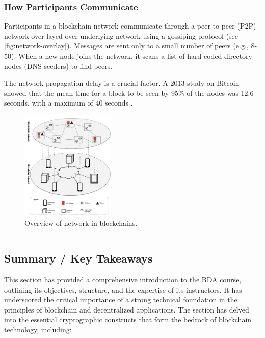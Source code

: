 \subsubsection{How Participants
	Communicate}\label{how-participants-communicate}

Participants in a blockchain network communicate through a peer-to-peer
(P2P) network over-layed over underlying network using a gossiping protocol (see \autoref{fig:network-overlay}). Messages are sent only to a
small number of peers (e.g., 8-50). When a new node joins the network,
it scans a list of hard-coded directory nodes (DNS seeders) to find
peers.

The network propagation delay is a crucial factor. A 2013 study on
Bitcoin showed that the mean time for a block to be seen by 95\% of the
nodes was 12.6 seconds, with a maximum of 40 seconds .

\begin{figure}[t]
	\begin{center}
		\includegraphics[width=0.4\textwidth]{./figs/network-overlay.png} 
		\caption{Overview of network in blockchains.}		
		\label{fig:network-overlay}
	\end{center}	
\end{figure}

\begin{center}\rule{0.5\linewidth}{0.5pt}\end{center}

\subsection{Summary / Key Takeaways}\label{summary-key-takeaways}

This section has provided a comprehensive introduction to the BDA
course, outlining its objectives, structure, and the expertise of its
instructors. It has underscored the critical importance of a strong
technical foundation in the principles of blockchain and decentralized
applications. The section has delved into the essential cryptographic
constructs that form the bedrock of blockchain technology, including:

